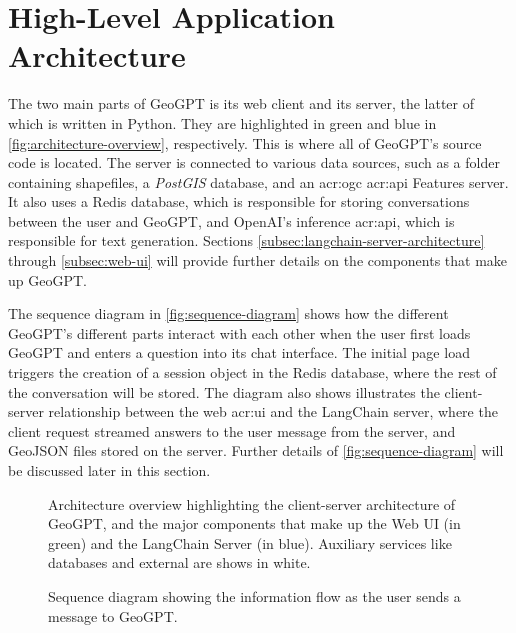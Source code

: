 \section{High-Level Application Architecture}
\label{sec:high-level-application-architecture}

The two main parts of GeoGPT is its web client and its server, the latter of which is written in Python. They are highlighted in green and blue in \autoref{fig:architecture-overview}, respectively. This is where all of GeoGPT's source code is located. The server is connected to various data sources, such as a folder containing shapefiles, a \textit{PostGIS} database, and an \acrshort{acr:ogc} \acrshort{acr:api} Features server. It also uses a Redis database, which is responsible for storing conversations between the user and GeoGPT, and OpenAI's inference \acrshort{acr:api}, which is responsible for text generation. Sections \ref{subsec:langchain-server-architecture} through \ref{subsec:web-ui} will provide further details on the components that make up GeoGPT.

The sequence diagram in \autoref{fig:sequence-diagram} shows how the different GeoGPT's different parts interact with each other when the user first loads GeoGPT and enters a question into its chat interface. The initial page load triggers the creation of a session object in the Redis database, where the rest of the conversation will be stored. The diagram also shows illustrates the client-server relationship between the web \acrshort{acr:ui} and the LangChain server, where the client request streamed answers to the user message from the server, and GeoJSON files stored on the server. Further details of \autoref{fig:sequence-diagram} will be discussed later in this section.

\begin{figure}
    \centering
    \caption[Architecture overview for GeoGPT]{Architecture overview highlighting the client-server architecture of GeoGPT, and the major components that make up the Web UI (in green) and the LangChain Server (in blue). Auxiliary services like databases and external  are shows in white.}
    \label{fig:architecture-overview}
\end{figure}

\begin{figure}
    \caption[Sequence diagram for GeoGPT]{Sequence diagram showing the information flow as the user sends a message to GeoGPT.}
    \label{fig:sequence-diagram}
\end{figure}


